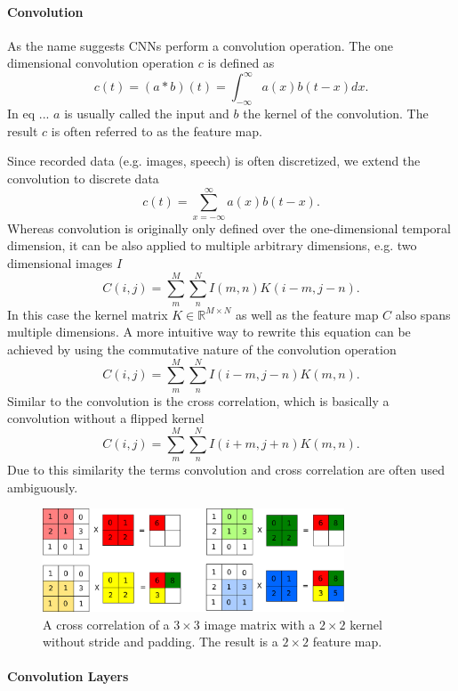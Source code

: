 \paragraph{Convolution}

As the name suggests CNNs perform a convolution operation. The one dimensional convolution operation $c$ is defined as
\[
c(t) = (a * b)(t) = \int_{- \infty}^{\infty} a(x)b(t-x) dx.
\]
In eq ... $a$ is usually called the input and $b$ the kernel of the convolution. The result $c$ is often referred to as the feature map.

Since recorded data (e.g. images, speech) is often discretized, we extend the convolution to discrete data
\[
c(t) = \sum_{x = - \infty}^{\infty} a(x)b(t-x).
\]
Whereas convolution is originally only defined over the one-dimensional temporal dimension, it can be also applied to multiple arbitrary dimensions, e.g. two dimensional images $I$
\[
C(i,j) = \sum_m^M \sum_n^N I(m,n) K(i - m, j -n).
\]
In this case the kernel matrix $K \in \mathbb{R}^{M \times N} $ as well as the feature map $C$ also spans multiple dimensions.
A more intuitive way to rewrite this equation can be achieved by using the commutative nature of the convolution operation
\[
C(i,j) = \sum_m^M \sum_n^N I(i - m,j - n) K(m, n).
\]
Similar to the convolution is the cross correlation, which is basically a convolution without a flipped kernel
\[
C(i,j) = \sum_m^M \sum_n^N I(i + m,j + n) K(m, n).
\]
Due to this similarity the terms convolution and cross correlation are often used ambiguously.

\begin{figure}
	\centering
    	\includegraphics[width=0.8\textwidth]{imgs/convolution.png} 
    \caption{A cross correlation of a $3\times3$ image matrix with a $2\times2$ kernel without stride and padding. The result is a $2\times2$ feature map.}
	\label{fig:conv}
\end{figure}

\paragraph{Convolution Layers}

